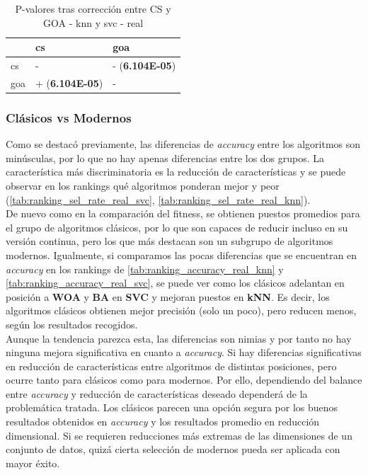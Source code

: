 \begin{table}
    \centering
    \begin{tabular}{lll}
        \toprule
        {}  & cs                     & goa                    \\
        \midrule
        cs  & -                      & - (\textbf{6.104E-05}) \\
        goa & + (\textbf{6.104E-05}) & -                      \\
        \bottomrule
    \end{tabular}
    \caption{P-valores tras corrección entre CS y GOA - knn y svc - real}
    \label{tab:pval_corr_best-worst-real_svc_knn}
\end{table}

\subsubsection{Clásicos vs Modernos}
Como se destacó previamente, las diferencias de \textit{accuracy} entre los algoritmos son minúsculas, por lo que no hay apenas diferencias entre los dos grupos. La característica más discriminatoria es la reducción de características y se puede observar en los rankings qué algoritmos ponderan mejor y peor (\ref{tab:ranking_sel_rate_real_svc}, \ref{tab:ranking_sel_rate_real_knn}).\\[6pt]
De nuevo como en la comparación del fitness, se obtienen puestos promedios para el grupo de algoritmos clásicos, por lo que son capaces de reducir incluso en su versión continua, pero los que más destacan son un subgrupo de algoritmos modernos. Igualmente, si comparamos las pocas diferencias que se encuentran en \textit{accuracy} en los rankings de \ref{tab:ranking_accuracy_real_knn} y \ref{tab:ranking_accuracy_real_svc}, se puede ver como los clásicos adelantan en posición a \textbf{WOA} y \textbf{BA} en \textbf{SVC} y mejoran puestos en \textbf{kNN}. Es decir, los algoritmos clásicos obtienen mejor precisión (solo un poco), pero reducen menos, según los resultados recogidos.\\[6pt]
Aunque la tendencia parezca esta, las diferencias son nimias y por tanto no hay ninguna mejora significativa en cuanto a \textit{accuracy}. Si hay diferencias significativas en reducción de características entre algoritmos de distintas posiciones, pero ocurre tanto para clásicos como para modernos. Por ello, dependiendo del balance entre \textit{accuracy} y reducción de características  deseado dependerá de la problemática tratada. Los clásicos parecen una opción segura por los buenos resultados obtenidos en \textit{accuracy} y los resultados promedio en reducción dimensional. Si se requieren reducciones más extremas de las dimensiones de un conjunto de datos, quizá cierta selección de modernos pueda ser aplicada con mayor éxito.